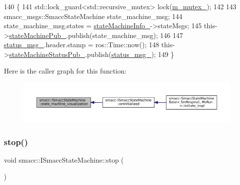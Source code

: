 \begin{DoxyCode}
140 \{
141     std::lock\_guard<std::recursive\_mutex> lock(\hyperlink{classsmacc_1_1ISmaccStateMachine_aac785541646e5c517273bf31072505a1}{m\_mutex\_});
142 
143     smacc\_msgs::SmaccStateMachine state\_machine\_msg;
144     state\_machine\_msg.states = \hyperlink{classsmacc_1_1ISmaccStateMachine_a0914aa27c3f51374c338d89a32b135d1}{stateMachineInfo\_}->stateMsgs;
145     this->\hyperlink{classsmacc_1_1ISmaccStateMachine_af4aa9fed70bd4c57b19e3370fbd25de7}{stateMachinePub\_}.publish(state\_machine\_msg);
146 
147     \hyperlink{classsmacc_1_1ISmaccStateMachine_a4f47dd614f12a95e7a3c46d465ce4b13}{status\_msg\_}.header.stamp = ros::Time::now();
148     this->\hyperlink{classsmacc_1_1ISmaccStateMachine_a55a7c7b26ad4dfea441c62c6326a5414}{stateMachineStatusPub\_}.publish(\hyperlink{classsmacc_1_1ISmaccStateMachine_a4f47dd614f12a95e7a3c46d465ce4b13}{status\_msg\_});
149 \}
\end{DoxyCode}
Here is the caller graph for this function\+:
\nopagebreak
\begin{figure}[H]
\begin{center}
\leavevmode
\includegraphics[width=350pt]{classsmacc_1_1ISmaccStateMachine_ac03029f770422d0ea77ea9856b8cb1a8_icgraph}
\end{center}
\end{figure}
\mbox{\label{classsmacc_1_1ISmaccStateMachine_adcb1b55e014f982a713a863ffb0261d3}} 
\subsubsection{\texorpdfstring{stop()}{stop()}}
{\footnotesize\ttfamily void smacc\+::\+I\+Smacc\+State\+Machine\+::stop (\begin{DoxyParamCaption}{ }\end{DoxyParamCaption})\hspace{0.3cm}{\ttfamily [virtual]}}



